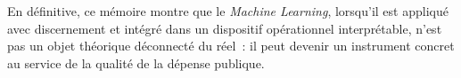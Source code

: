 \documentclass[12pt,a4paper]{article}
\begin{document}
\medskip

En d\'efinitive, ce m\'emoire montre que le \textit{Machine Learning}, lorsqu'il
est appliqu\'e avec discernement et int\'egr\'e dans un dispositif op\'erationnel
interpr\'etable, n'est pas un objet th\'eorique d\'econnect\'e du r\'eel~: il peut devenir
un instrument concret au service de la qualit\'e de la d\'epense publique.

\newpage

\end{document}
